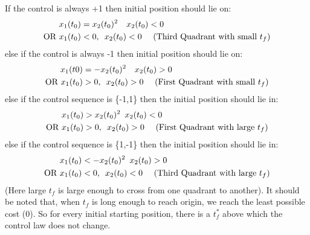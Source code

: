 \begin{enumerate}
If the control is always +1 then initial position should lie on:
  \begin{align*}
   x_1(t_0) &= x_2(t_0)^2 \quad x_2(t_0) < 0 \\
   \mbox{OR } x_1(t_0) &< 0 , \enskip x_2(t_0) < 0 \quad \mbox{ (Third Quadrant with small } t_f)
  \end{align*}
else if the control is always -1 then initial position should lie on:
  \begin{align*}
   x_1(t0) &= -x_2(t_0)^2 \quad x_2(t_0) > 0\\
   \mbox{OR } x_1(t_0) &> 0 , \enskip x_2(t_0) > 0 \quad \mbox{ (First Quadrant with small } t_f)
  \end{align*}
else if the control sequence is \{-1,1\} then the initial position should lie in:
  \begin{align*}
   x_1(t_0) &> x_2(t_0)^2 \enskip x_2(t_0) < 0\\
   \mbox{OR } x_1(t_0) &> 0 , \enskip x_2(t_0) > 0 \quad \mbox{ (First Quadrant with large } t_f)
  \end{align*}
else if the control sequence is \{1,-1\} then the initial position should lie in:
  \begin{align*}
   x_1(t_0) &< -x_2(t_0)^2 \enskip x_2(t_0) > 0\\
   \mbox{OR } x_1(t_0) &< 0 , \enskip x_2(t_0) < 0 \quad \mbox{ (Third Quadrant with large } t_f)
  \end{align*}
(Here large $t_f$ is large enough to cross from one quadrant to another). It should be noted that, when $t_f $ is long enough to reach origin, we reach the least possible cost (0). So for every initial starting position, there is a $t_f^*$ above which the control law does not change.


\end{enumerate}
